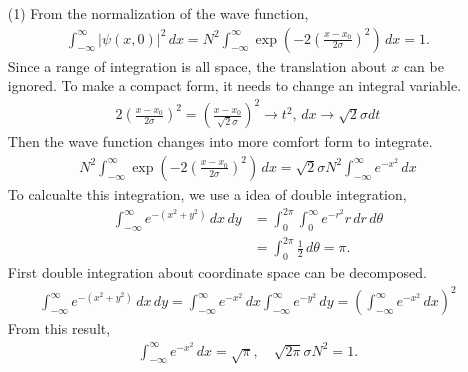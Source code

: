 \documentclass[aps,floatfix,nofootinbib,superscriptaddress,fleqn]{revtex4}
\begin{document}
\begin{itemize}
\item[(1)] From the normalization of the wave function,
\begin{align}
          \int_{-\infty}^{\infty} |\psi(x,0)|^2\,dx=N^2\int_{-\infty}^{\infty}\exp\left(-2{\left(\frac{x-x_0}{2\sigma}\right)}^2\right) \,dx =1.
\end{align}
Since a range of integration is all space, the translation about $x$ can be ignored.
To make a compact form, it needs to change an integral variable.
\begin{align}
2{\left(\frac{x-x_0}{2\sigma}\right)}^2={\left(\frac{x-x_0}{\sqrt{2}\sigma}\right)}^2 \longrightarrow t^2,\, dx \longrightarrow  \sqrt{2}\sigma dt
\end{align}
Then the wave function changes into more comfort form to integrate.
\begin{align}
          N^2\int_{-\infty}^{\infty}\exp\left(-2{\left(\frac{x-x_0}{2\sigma}\right)}^2\right) \,dx
          =\sqrt{2}\sigma N^2\int_{-\infty}^{\infty} e^{-x^2} \,dx
\end{align}
To calcualte this integration, we use a idea of double integration,
\begin{align}
\int_{-\infty}^{\infty} e^{-(x^2+y^2)}\,dx\,dy &= \int_{0}^{2\pi}\int_{0}^{\infty} e^{-r^2}r\,dr\,d\theta
                                          \\   &= \int_{0}^{2\pi}\frac{1}{2}\,d\theta = \pi.
\end{align}
First double integration about coordinate space can be decomposed.
\begin{align}
  \int_{-\infty}^{\infty} e^{-(x^2+y^2)}\,dx\,dy 
    = \int_{-\infty}^{\infty} e^{-x^2}\,dx\int_{-\infty}^{\infty}e^{-y^2}\,dy
    = \left(\int_{-\infty}^{\infty} e^{-x^2}\,dx\right)^2
\end{align}
From this result,
\begin{align}
\int_{-\infty}^{\infty} e^{-x^2} \,dx = \sqrt{\pi},\quad \sqrt{2\pi}\sigma N^2 =1.
\end{align}

\end{itemize}
\end{document}
